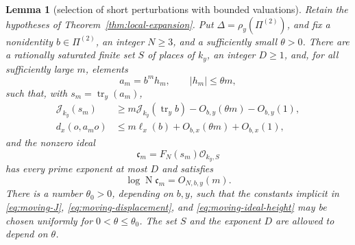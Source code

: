 \documentclass[11pt,reqno]{amsart}
\newtheorem{lemma}[theorem]{Lemma}
\theoremstyle{definition}
\theoremstyle{remark}
\newcommand{\cO}{\mathcal O}
\newcommand{\cJ}{\mathcal J}
\newcommand{\Tr}{\operatorname{tr}}
\newcommand{\Norm}{\operatorname{N}}
\begin{document}
\begin{lemma}[selection of short perturbations with bounded valuations]
\label{lem:moving-bounded-exponents}
Retain the hypotheses of Theorem~\ref{thm:local-expansion}.  Put
\(\Delta=\rho_y(\Pi^{(2)})\), and fix a nonidentity \(b\in\Pi^{(2)}\), an
integer \(N\ge3\), and a sufficiently small \(\theta>0\).  There are a
rationally saturated finite set \(S\) of places of \(k_y\), an integer
\(D\ge1\), and, for all sufficiently large \(m\), elements
\begin{equation}\label{eq:moving-am}
 a_m=b^m h_m,\qquad |h_m|\le\theta m,
\end{equation}
such that, with \(s_m=\Tr_y(a_m)\),
\begin{align}
 \cJ_{k_y}(s_m)
 &\ge m\cJ_{k_y}(\Tr_y b)-O_{b,y}(\theta m)-O_{b,y}(1),
 \label{eq:moving-J}\\
 d_x(o,a_mo)
 &\le m\ell_x(b)+O_{b,x}(\theta m)+O_{b,x}(1),
 \label{eq:moving-displacement}
\end{align}
and the nonzero ideal
\begin{equation}\label{eq:moving-ideal}
 \mathfrak c_m=F_N(s_m)\cO_{k_y,S}
\end{equation}
has every prime exponent at most \(D\) and satisfies
\begin{equation}\label{eq:moving-ideal-height}
 \log\Norm\mathfrak c_m=O_{N,b,y}(m).
\end{equation}
There is a number \(\theta_0>0\), depending on \(b,y\), such that the
constants implicit in \eqref{eq:moving-J},
\eqref{eq:moving-displacement}, and
\eqref{eq:moving-ideal-height} may be chosen uniformly for
\(0<\theta\le\theta_0\).  The set \(S\) and the exponent \(D\) are allowed
to depend on \(\theta\).
\end{lemma}
\end{document}
